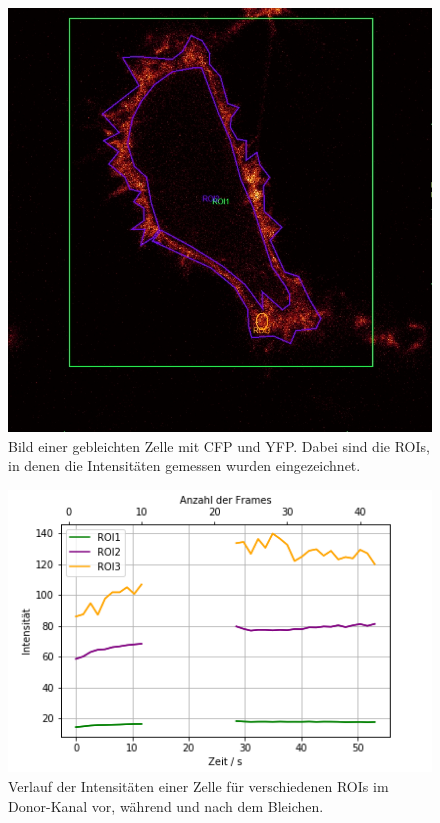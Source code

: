\begin{figure}[h]
    \centering
    \includegraphics[scale = 0.45]{Bilder/bleachROI.jpg}
    \caption{Bild einer gebleichten Zelle mit CFP und YFP. Dabei sind die ROIs, in denen die Intensitäten gemessen wurden eingezeichnet.}
    \label{bild:bleachROI}
\end{figure}

\begin{figure}[h]
    \centering
    \includegraphics[scale = 0.45]{Bilder/bleachPlotD.png}
    \caption{Verlauf der Intensitäten einer Zelle für verschiedenen ROIs im Donor-Kanal vor, während und nach dem Bleichen.}
    \label{bild:bleachPlotD}
\end{figure}

